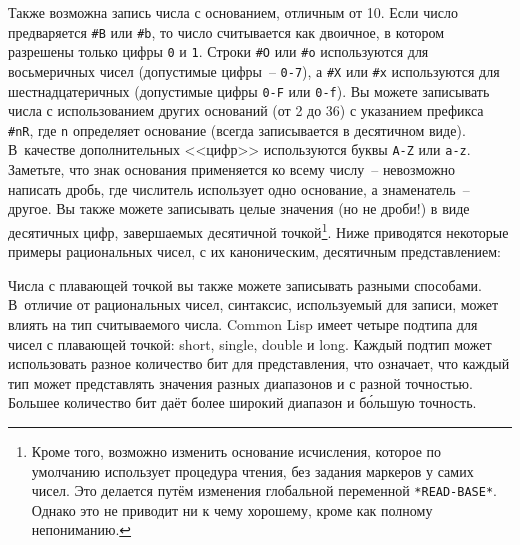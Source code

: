 Также возможна запись числа с основанием, отличным от 10.  Если число предваряется
\lstinline{#B} или \lstinline{#b}, то число считывается как двоичное, в котором разрешены только
цифры \lstinline{0} и \lstinline{1}.  Строки \lstinline{#O} или \lstinline{#o} используются для восьмеричных
чисел (допустимые цифры~-- \lstinline{0-7}), а \lstinline{#X} или \lstinline{#x} используются для
шестнадцатеричных (допустимые цифры \lstinline{0-F} или \lstinline{0-f}).  Вы можете записывать
числа с использованием других оснований (от 2 до 36) с указанием префикса \lstinline{#nR}, где
\lstinline{n} определяет основание (всегда записывается в десятичном виде).  В~качестве
дополнительных <<цифр>> используются буквы \lstinline{A-Z} или \lstinline{a-z}.  Заметьте, что знак
основания применяется ко всему числу~-- невозможно написать дробь, где числитель
использует одно основание, а знаменатель~-- другое.  Вы также можете записывать целые
значения (но не дроби!) в виде десятичных цифр, завершаемых десятичной
точкой\footnote{Кроме того, возможно изменить основание исчисления, которое по умолчанию
  использует процедура чтения, без задания маркеров у самих чисел. Это делается путём
  изменения глобальной переменной \lstinline{*READ-BASE*}.  Однако это не приводит ни к чему
  хорошему, кроме как полному непониманию.}\hspace{\footnotenegspace}.  Ниже приводятся некоторые примеры
рациональных чисел, с их каноническим, десятичным представлением:


Числа с плавающей точкой вы также можете записывать разными способами.  В~отличие от
рациональных чисел, синтаксис, используемый для записи, может влиять на тип считываемого
числа.  Common Lisp имеет четыре подтипа для чисел с пла\-ваю\-щей точкой: short, single,
double и long.  Каждый подтип может использовать разное количество бит для представления,
что означает, что каждый тип может представлять значения разных диапазонов и с разной
точностью.  Большее количество бит даёт более широкий диапазон и б\'{о}льшую
точность.

